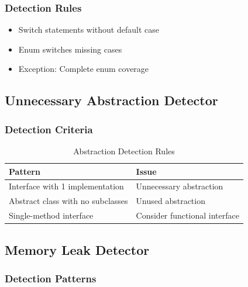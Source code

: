 \documentclass[12pt,a4paper]{article}
\begin{document}
    \subsubsection{Detection Rules}

    \begin{itemize}[leftmargin=0.5in]
        \item Switch statements without default case
        \item Enum switches missing cases
        \item Exception: Complete enum coverage
    \end{itemize}

    \subsection{Unnecessary Abstraction Detector}

    \subsubsection{Detection Criteria}

    \begin{table}[H]
        \caption{Abstraction Detection Rules}
        \begin{tabular}{|l|l|}
            \hline
            \textbf{Pattern} & \textbf{Issue} \\
            \hline
            Interface with 1 implementation & Unnecessary abstraction \\
            \hline
            Abstract class with no subclasses & Unused abstraction \\
            \hline
            Single-method interface & Consider functional interface \\
            \hline
        \end{tabular}
    \end{table}

    \subsection{Memory Leak Detector}

    \subsubsection{Detection Patterns}
\end{document}

